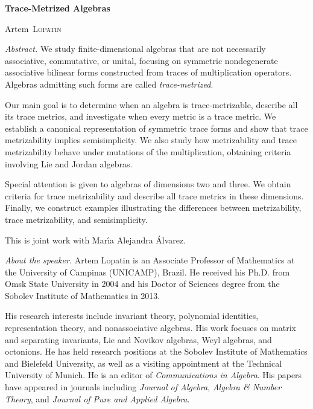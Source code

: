 \documentclass[a4paper,10pt]{amsart}
\begin{document}
\thispagestyle{empty}

\begin{center}
    \textbf{\Large{Trace-Metrized Algebras}}
\end{center}

\vskip 0.2cm

\begin{center}
    Artem~\textsc{Lopatin}
\end{center}

\vskip 0.8cm

\textit{Abstract.} We study finite-dimensional algebras that are not necessarily associative,
commutative, or unital, focusing on symmetric nondegenerate associative
bilinear forms constructed from traces of multiplication operators.
Algebras admitting such forms are called \emph{trace-metrized}.

Our main goal is to determine when an algebra is trace-metrizable,
describe all its trace metrics, and investigate when every metric is a
trace metric. We establish a canonical representation of symmetric
trace forms and show that trace metrizability implies semisimplicity.
We also study how metrizability and trace metrizability behave under
mutations of the multiplication, obtaining criteria involving Lie and
Jordan algebras.

Special attention is given to algebras of dimensions two and three.
We obtain criteria for trace metrizability and describe all trace metrics
in these dimensions. Finally, we construct examples illustrating the
differences between metrizability, trace metrizability, and semisimplicity.

This is joint work with Mar\'{\i}a Alejandra \'{A}lvarez.

\vskip 0.5cm

\textit{About the speaker.} Artem Lopatin is an Associate Professor of Mathematics at the University
of Campinas (UNICAMP), Brazil. He received his Ph.D. from Omsk State
University in 2004 and his Doctor of Sciences degree from the Sobolev
Institute of Mathematics in 2013.

His research interests include invariant theory, polynomial identities,
representation theory, and nonassociative algebras. His work focuses
on matrix and separating invariants, Lie and Novikov algebras, Weyl
algebras, and octonions. He has held research positions at the Sobolev
Institute of Mathematics and Bielefeld University, as well as a visiting
appointment at the Technical University of Munich. He is an editor of
\emph{Communications in Algebra}. His papers have appeared in journals
including \emph{Journal of Algebra}, \emph{Algebra \& Number Theory},
and \emph{Journal of Pure and Applied Algebra}.
\end{document}
